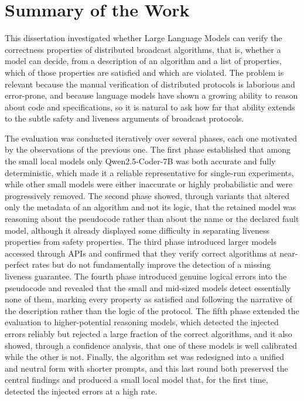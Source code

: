 \label{chap:conclusion}

\section{Summary of the Work}

This dissertation investigated whether Large Language Models can verify the correctness properties of distributed broadcast algorithms, that is, whether a model can decide, from a description of an algorithm and a list of properties, which of those properties are satisfied and which are violated. The problem is relevant because the manual verification of distributed protocols is laborious and error-prone, and because language models have shown a growing ability to reason about code and specifications, so it is natural to ask how far that ability extends to the subtle safety and liveness arguments of broadcast protocols.

The evaluation was conducted iteratively over several phases, each one motivated by the observations of the previous one. The first phase established that among the small local models only Qwen2.5-Coder-7B was both accurate and fully deterministic, which made it a reliable representative for single-run experiments, while other small models were either inaccurate or highly probabilistic and were progressively removed. The second phase showed, through variants that altered only the metadata of an algorithm and not its logic, that the retained model was reasoning about the pseudocode rather than about the name or the declared fault model, although it already displayed some difficulty in separating liveness properties from safety properties. The third phase introduced larger models accessed through APIs and confirmed that they verify correct algorithms at near-perfect rates but do not fundamentally improve the detection of a missing liveness guarantee. The fourth phase introduced genuine logical errors into the pseudocode and revealed that the small and mid-sized models detect essentially none of them, marking every property as satisfied and following the narrative of the description rather than the logic of the protocol. The fifth phase extended the evaluation to higher-potential reasoning models, which detected the injected errors reliably but rejected a large fraction of the correct algorithms, and it also showed, through a confidence analysis, that one of these models is well calibrated while the other is not. Finally, the algorithm set was redesigned into a unified and neutral form with shorter prompts, and this last round both preserved the central findings and produced a small local model that, for the first time, detected the injected errors at a high rate.

